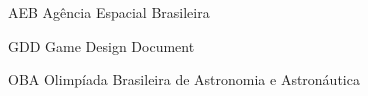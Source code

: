 
\begin{siglas}
    \item [AEB] Agência Espacial Brasileira
    \item [GDD] Game Design Document
    \item [OBA] Olimpíada Brasileira de Astronomia e Astronáutica
\end{siglas}